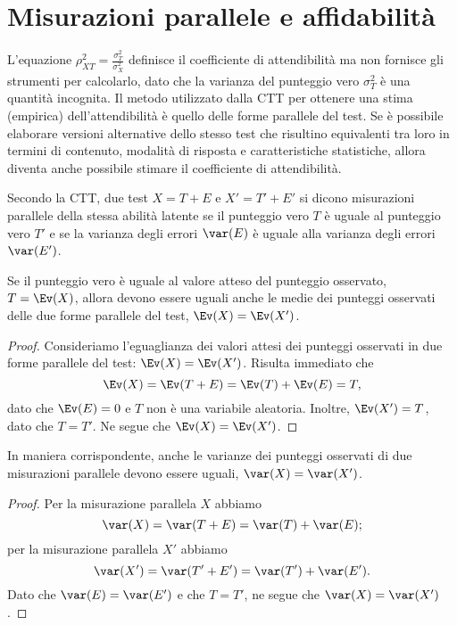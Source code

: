 \section{Misurazioni parallele e affidabilità}

L'equazione $\rho_{XT}^2 = \frac{\sigma_{T}^2}{\sigma_X^2}$ definisce il coefficiente di attendibilità ma non  fornisce gli strumenti per calcolarlo, dato che la varianza del punteggio vero $\sigma_{T}^2$  è una quantità incognita.
Il metodo utilizzato dalla CTT per ottenere una stima (empirica) dell'attendibilità è quello delle forme parallele del test. 
Se è possibile  elaborare versioni alternative dello stesso test che risultino equivalenti tra loro in termini di contenuto, modalità di risposta e caratteristiche statistiche, allora diventa anche possibile stimare il coefficiente di attendibilità.

\begin{defn}
Secondo la CTT, due test $X=T+E$ e $X'=T'+E'$ si dicono misurazioni parallele della stessa abilità latente se il punteggio vero $T$ è uguale al punteggio vero $T'$ e se la varianza degli errori $\var(E)$ è uguale alla varianza degli errori $\var(E')$. 
\end{defn}
Se il punteggio vero è uguale al valore atteso del punteggio osservato, $T = \Ev(X)$, allora devono essere uguali anche le medie dei punteggi osservati delle due forme parallele del test, $\Ev(X) = \Ev(X')$. 

\begin{proof}
Consideriamo l'eguaglianza dei valori attesi dei punteggi osservati in due forme parallele del test: $\Ev(X) = \Ev(X')$. Risulta immediato che
\[
 \Ev(X) = \Ev(T + E) =  \Ev(T) +  \Ev(E) = T,
\]
 dato che $\Ev(E)=0$ e $T$ non è una variabile aleatoria. Inoltre, $\Ev(X')=T$, dato che $T=T'$. Ne segue che $\Ev(X) =\Ev(X')$.
\end{proof}

In maniera corrispondente, anche le varianze dei punteggi osservati di due misurazioni parallele devono essere uguali, $\var(X) = \var(X')$. 

\begin{proof}
Per la misurazione parallela $X$ abbiamo 
\[
 \var(X) = \var(T + E)=  \var(T) +  \var(E);
\]
per la misurazione parallela $X'$ abbiamo
\[
 \var(X') = \var(T' + E')
 =  \var(T') +  \var(E').
\]
Dato che $\var(E)=\var(E')$ e che $T=T'$, ne segue che $\var(X) =\var(X')$.
\end{proof}

